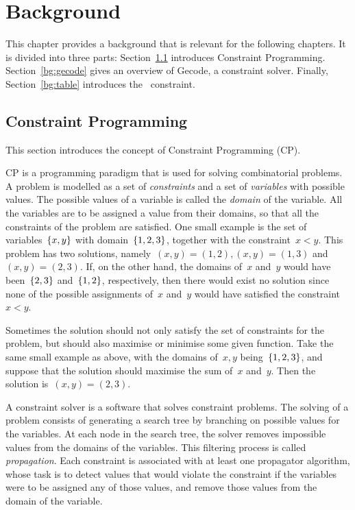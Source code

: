 \documentclass[a4paper,11pt]{article}
\newcommand{\Secref}[1]{Section~\ref{#1}}
\newcommand{\Table}{\Constraint{Table}~}
\numberwithin{equation}{section}
\begin{document}
\section{Background}
\label{bg}


This chapter provides a background that is relevant for the
following chapters. It is divided into three parts: \Secref{bg:cp}
introduces Constraint Programming. \Secref{bg:gecode} gives an overview
of Gecode, a constraint solver. Finally, \Secref{bg:table} introduces
the \Table constraint.

\subsection{Constraint Programming}
\label{bg:cp}
This section introduces the concept of Constraint Programming (CP).

CP is a programming paradigm that is used for solving
combinatorial problems. A problem is
modelled as a set of \emph{constraints} and a
set of \emph{variables} with possible values. The possible values of 
a variable is called the \emph{domain} of the variable.
All the variables are to be assigned a value
from their domains, so that all the constraints of the problem
are satisfied.
One small example is the set of variables~$\left\{x,y\right\}$ with
domain~$\left\{1,2,3\right\}$,
together with the constraint~$x<y$. This problem has two solutions, 
namely~$(x,y) = (1,2), (x,y) = (1,3)$ and~$(x,y) = (2,3)$.
If, on the other hand, the domains of~$x$ and~$y$ would have been~$\left\{2,3\right\}$
and~$\left\{1,2\right\}$, respectively, then there would exist no solution since none of
the possible assignments of~$x$ and~$y$ would have satisfied the constraint~$x<y$.

Sometimes the solution should not only satisfy the set of constraints for the
problem, but should also maximise or minimise some given function.
Take the same small example as above, with
the domains of~$x,y$ being~$\left\{1,2,3\right\}$, and suppose that the solution
should maximise the sum of~$x$ and~$y$. Then the solution is~$(x,y) = (2,3)$.

A constraint solver is a software that solves constraint problems.
The solving of a problem consists of generating a search tree by branching
on possible values for the variables. At each node in the search tree,
the solver removes impossible values from the domains of the variables.
This filtering process is called \emph{propagation}. Each constraint is
associated with at least one propagator algorithm, whose task is to detect
values that would violate the constraint if the variables were to be assigned
any of those values, and remove those values from the domain of the variable.
\end{document}
